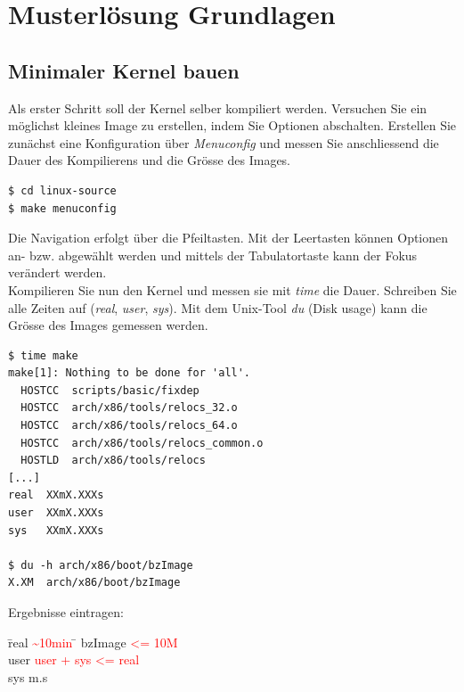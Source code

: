\section{Musterlösung Grundlagen}

\subsection{Minimaler Kernel bauen}

Als erster Schritt soll der Kernel selber kompiliert werden. Versuchen Sie ein möglichst
kleines Image zu erstellen, indem Sie Optionen abschalten. Erstellen Sie zunächst eine 
Konfiguration über \emph{Menuconfig} und messen Sie anschliessend die Dauer des Kompilierens und
die Grösse des Images.

\begin{lstlisting}
$ cd linux-source
$ make menuconfig
\end{lstlisting}

Die Navigation erfolgt über die Pfeiltasten. Mit der Leertasten können Optionen an- bzw. abgewählt werden
und mittels der Tabulatortaste kann der Fokus verändert werden. \\

Kompilieren Sie nun den Kernel und messen sie mit \emph{time} die Dauer. Schreiben Sie alle Zeiten auf (\emph{real}, \emph{user}, \emph{sys}).
Mit dem Unix-Tool \emph{du} (Disk usage) kann die Grösse des Images gemessen werden.

\begin{lstlisting}
$ time make
make[1]: Nothing to be done for 'all'.
  HOSTCC  scripts/basic/fixdep
  HOSTCC  arch/x86/tools/relocs_32.o
  HOSTCC  arch/x86/tools/relocs_64.o
  HOSTCC  arch/x86/tools/relocs_common.o
  HOSTLD  arch/x86/tools/relocs
[...]
real  XXmX.XXXs
user  XXmX.XXXs
sys   XXmX.XXXs

$ du -h arch/x86/boot/bzImage 
X.XM  arch/x86/boot/bzImage

\end{lstlisting}
\hfill

Ergebnisse eintragen:
\begin{tabbing}
 \hspace{1cm}   \= real \hspace{0.2cm} \= \textcolor{red}{\textasciitilde 10min} \hspace{0.5cm} \= \hspace{0.2cm} bzImage \textcolor{red}{<= 10M} \\
                \> user                \>  \textcolor{red}{user + sys <= real} \\
                \> sys                 \> \underline{\hspace{0.4cm}}m\underline{\hspace{0.4cm}}.\underline{\hspace{0.6cm}}s 
\end{tabbing}


